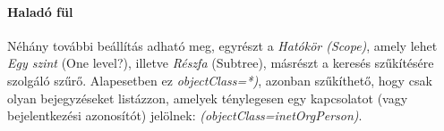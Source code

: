 \paragraph{Haladó fül} Néhány további beállítás adható meg, egyrészt a \emph{Hatókör (Scope)}, amely lehet \emph{Egy
  szint} (One level?), illetve \emph{Részfa} (Subtree), másrészt a keresés szűkítésére szolgáló szűrő. Alapesetben ez
  \emph{objectClass=*)}, azonban szűkíthető, hogy csak olyan bejegyzéseket listázzon, amelyek ténylegesen egy
  kapcsolatot (vagy bejelentkezési azonosítót) jelölnek: \emph{(objectClass=inetOrgPerson)}.

